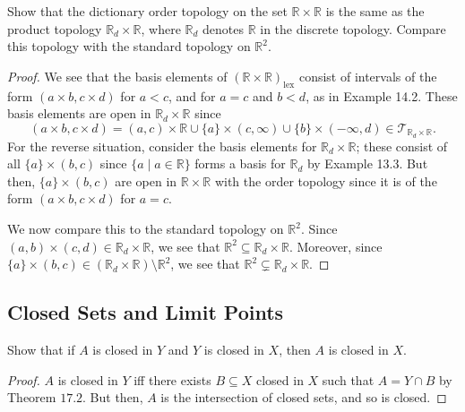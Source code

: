 \documentclass[12pt]{article}
\theoremstyle{remark}
\begin{document}
\begin{problem}
  Show that the dictionary order topology on the set $\mathbb{R} \times \mathbb{R}$ is the same as the product topology $\mathbb{R}_d \times \mathbb{R}$, where $\mathbb{R}_d$ denotes $\mathbb{R}$ in the discrete topology. Compare this topology with the standard topology on $\mathbb{R}^2$.
\end{problem}
\begin{proof}
  We see that the basis elements of $(\mathbb{R} \times
  \mathbb{R})_\mathrm{lex}$ consist of intervals of the form $(a \times b, c
  \times d)$ for $a < c$, and for $a = c$ and $b < d$, as in Example 14.2.
  These basis elements are open in $\mathbb{R}_d \times \mathbb{R}$ since
  \begin{equation*}
    (a \times b,c\times d) = (a,c) \times \mathbb{R} \cup \{a\} \times (c,\infty)
    \cup \{b\} \times (-\infty,d) \in \mathcal{T}_{\mathbb{R}_d \times
    \mathbb{R}}.
  \end{equation*}
  For the reverse situation, consider the basis elements for $\mathbb{R}_d
  \times \mathbb{R}$; these consist of all $\{a\} \times (b,c)$ since $\{a \mid
    a \in \mathbb{R}\}$ forms a basis for $\mathbb{R}_d$ by Example 13.3. But then, $\{a\} \times (b,c)$ are open in $\mathbb{R} \times \mathbb{R}$ with the order topology since it is of the form $(a \times b, c \times d)$ for $a = c$.
  \par We now compare this to the standard topology on $\mathbb{R}^2$. Since $(a,b) \times (c,d) \in \mathbb{R}_d \times \mathbb{R}$, we see that $\mathbb{R}^2 \subseteq \mathbb{R}_d \times \mathbb{R}$. Moreover, since $\{a\} \times (b,c) \in (\mathbb{R}_d \times \mathbb{R}) \setminus \mathbb{R}^2$, we see that $\mathbb{R}^2 \subsetneq \mathbb{R}_d \times \mathbb{R}$.
\end{proof}

\subsection{Closed Sets and Limit Points}
\setcounter{subsubsection}{1}
\begin{problem}
  Show that if $A$ is closed in $Y$ and $Y$ is closed in $X$, then $A$ is closed in $X$.
\end{problem}
\begin{proof}
  $A$ is closed in $Y$ iff there exists $B \subseteq X$ closed in $X$ such that $A = Y \cap B$ by Theorem $17.2$. But then, $A$ is the intersection of closed sets, and so is closed.
\end{proof}
\end{document}
